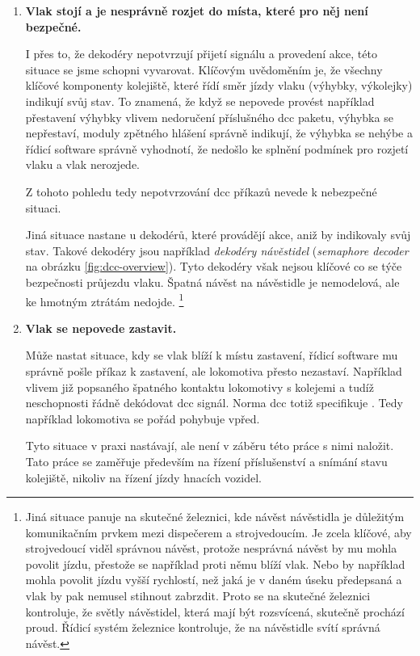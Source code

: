 \begin{enumerate}
\item \textbf{Vlak stojí a je nesprávně rozjet do místa, které pro něj není
bezpečné.}

	I přes to, že dekodéry nepotvrzují přijetí signálu a provedení akce, této
	situace se jsme schopni vyvarovat. Klíčovým uvědoměním je, že všechny klíčové
	komponenty kolejiště, které řídí směr jízdy vlaku (výhybky, výkolejky) indikují
	svůj stav. To znamená, že když se nepovede provést například přestavení výhybky
	vlivem nedoručení příslušného \gls{dcc} paketu, výhybka se nepřestaví, moduly
	zpětného hlášení správně indikují, že výhybka se nehýbe a řídicí software
	správně vyhodnotí, že nedošlo ke splnění podmínek pro rozjetí vlaku a vlak
	nerozjede.

	Z tohoto pohledu tedy nepotvrzování \gls{dcc} příkazů nevede k nebezpečné
	situaci.

	Jiná situace nastane u dekodérů, které provádějí akce, aniž by indikovaly
	svůj stav. Takové dekodéry jsou například \textit{dekodéry návěstidel}
	(\textit{semaphore decoder} na obrázku \ref{fig:dcc-overview}). Tyto dekodéry
	však nejsou klíčové co se týče bezpečnosti průjezdu vlaku. Špatná návěst
	na návěstidle je nemodelová, ale ke hmotným ztrátám nedojde.
	\footnote{Jiná situace panuje na skutečné železnici, kde návěst návěstidla
	je důležitým komunikačním prvkem mezi dispečerem a strojvedoucím. Je zcela
	klíčové, aby strojvedoucí viděl správnou návěst, protože nesprávná návěst
	by mu mohla povolit jízdu, přestože se například proti němu blíží vlak. Nebo
	by například mohla povolit jízdu vyšší rychlostí, než jaká je v daném
	úseku předepsaná a vlak by pak nemusel stihnout zabrzdit. Proto se na skutečné
	železnici kontroluje, že světly návěstidel, která mají být rozsvícená,
	skutečně prochází proud. Řídicí systém železnice kontroluje, že na návěstidle
	svítí správná návěst.}

\item \textbf{Vlak se nepovede zastavit.}

	Může nastat situace, kdy se vlak blíží k místu zastavení, řídicí software
	mu správně pošle příkaz k zastavení, ale lokomotiva přesto nezastaví.
	Například vlivem již popsaného špatného kontaktu lokomotivy s kolejemi
	a tudíž neschopnosti řádně dekódovat \gls{dcc} signál. Norma \gls{dcc} totiž
	specifikuje .
	Tedy například lokomotiva se pořád pohybuje vpřed.

	Tyto situace v praxi nastávají, ale není v záběru této práce s nimi naložit.
	Tato práce se zaměřuje především na řízení příslušenství a snímání stavu
	kolejiště, nikoliv na řízení jízdy hnacích vozidel.

\end{enumerate}
